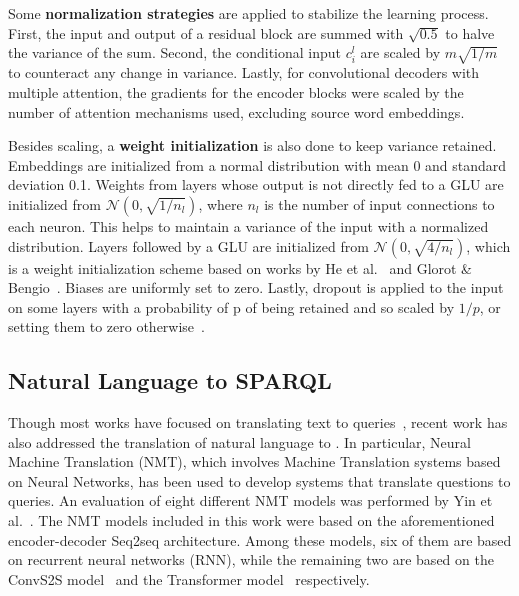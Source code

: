 Some \textbf{normalization strategies} are applied to stabilize the learning process. First, 
the input and output of a residual block are summed with $\sqrt{0.5}$ to halve the variance of 
the sum. Second, the conditional input $c_i^l$ are scaled by $m\sqrt{1/m}$ to counteract any 
change in variance. Lastly, for convolutional decoders with multiple attention, the gradients 
for the encoder blocks were scaled by the number of attention mechanisms used, excluding source 
word embeddings.

Besides scaling, a \textbf{weight initialization} is also done to keep variance retained. 
Embeddings are initialized from a normal distribution with mean 0 and standard deviation 0.1. 
Weights from layers whose output is not directly fed to a GLU are initialized from 
$\mathcal{N}(0, \sqrt{1/n_l})$, where $n_l$ is the number of input connections to each neuron. 
This helps to maintain a variance of the input with a normalized distribution. Layers followed 
by a GLU are initialized from $\mathcal{N}(0, \sqrt{4/n_l})$, which is a weight initialization 
scheme based on works by He et al.~\cite{semPar:HeZRS15} and Glorot \& Bengio~\cite{semPar:GlorotB10}. 
Biases are uniformly set to zero. Lastly, dropout is applied to the input on some layers with a 
probability of p of being retained and so scaled by $1/p$, or setting them to zero 
otherwise~\cite{semPar:SutskeverVL14}.

\subsection{Natural Language to SPARQL}
\label{cap2:theoFrame/semPar/nlToSparql}
Though most works have focused on translating text to \SQL{} queries~\cite{nmt:CaiXZYLL18,nmt:ZhongCoRR17}, 
recent work has also addressed the translation of natural language to \SPARQL{}. In particular, 
Neural Machine Translation (NMT), which involves Machine Translation systems based on Neural 
Networks, has been used to develop systems that translate questions to \SPARQL{} queries. An 
evaluation of eight different NMT models was performed by Yin et al.~\cite{nmt:nl-to-sparql-Yin19}. 
The NMT models included in this work were based on the aforementioned encoder-decoder Seq2seq 
architecture. Among these models, six of them are based on recurrent neural networks (RNN), 
while the remaining two are based on the ConvS2S model~\cite{nmt:convS2S-GehringAGYD17} and 
the Transformer model~\cite{semPar:VaswaniSPUJGKP17} respectively.

